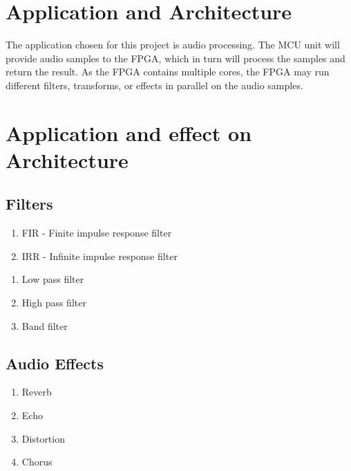 \section{Application and Architecture}

The application chosen for this project is audio processing. The MCU unit will
provide audio samples to the FPGA, which in turn will process the samples and
return the result. As the FPGA contains multiple cores, the FPGA may run
different filters, transforms, or effects in parallel on the audio samples.



\section{Application and effect on Architecture}


\subsection{Filters}

\begin{enumerate}
	\item FIR - Finite impulse response filter
	\item IRR - Infinite impulse response filter
\end{enumerate}

\begin{enumerate}
	\item Low pass filter
	\item High pass filter
	\item Band filter
\end{enumerate}

\subsection{Audio Effects}

\begin{enumerate}
	\item Reverb
	\item Echo
	\item Distortion
	\item Chorus
\end{enumerate}

